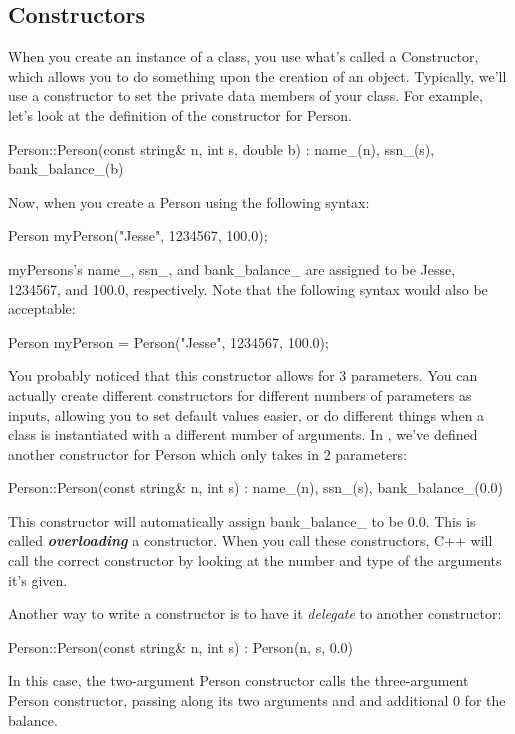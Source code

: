\documentclass{tufte-handout}
\begin{document}
\subsection{Constructors}
When you create an instance of a class, you use what's called a Constructor, which allows you to do something upon the creation of an object.
Typically, we'll use a constructor to set the private data members of your class.
For example, let's look at the definition of the constructor for Person.
\begin{Code}
Person::Person(const string& n, int s, double b)
        : name_(n), ssn_(s), bank_balance_(b)
{ }
\end{Code}
Now, when you create a Person using the following syntax:
\begin{Code}
    Person myPerson("Jesse", 1234567, 100.0);
\end{Code}

myPersons's name\_, ssn\_, and bank\_balance\_ are assigned to be Jesse, 1234567, and 100.0, respectively. 
Note that the following syntax would also be acceptable:
\begin{Code}
    Person myPerson = Person("Jesse", 1234567, 100.0);
\end{Code}

You probably noticed that this constructor allows for 3 parameters.
You can actually create different constructors for different numbers of parameters as inputs, allowing you to set default values easier, or do different things when a class is instantiated with a different number of arguments.
In , we've defined another constructor for Person which only takes in 2 parameters:
\begin{Code}
Person::Person(const string& n, int s) 
        : name_(n), ssn_(s), bank_balance_(0.0)
{ }
\end{Code}
This constructor will automatically assign bank\_balance\_ to be 0.0.
This is called \textit{\textbf{overloading}} a constructor.
When you call these constructors, C++ will call the correct constructor by looking at the number and type of the arguments it's given.

Another way to write a constructor is to have it \emph{delegate} to
another constructor:

\begin{Code}
Person::Person(const string& n, int s) 
        : Person(n, s, 0.0)
{ }
\end{Code}

\noindent In this case, the two-argument Person constructor calls the
three-argument Person constructor, passing along its two arguments and
and additional 0 for the balance.
\end{document}
